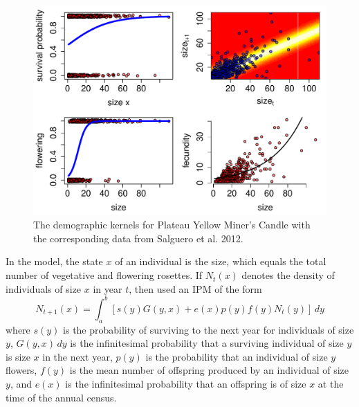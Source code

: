 \documentclass[12pt]{amsart}\usepackage[]{graphicx}\usepackage[]{color}
\makeatletter
\def\maxwidth{ %
  \ifdim\Gin@nat@width>\linewidth
    \linewidth
  \else
    \Gin@nat@width
  \fi
}
\newenvironment{kframe}{%
 \def\at@end@of@kframe{}%
 \ifinner\ifhmode%
  \def\at@end@of@kframe{\end{minipage}}%
  \begin{minipage}{\columnwidth}%
 \fi\fi%
 \def\FrameCommand##1{\hskip\@totalleftmargin \hskip-\fboxsep
 \colorbox{shadecolor}{##1}\hskip-\fboxsep
     \hskip-\linewidth \hskip-\@totalleftmargin \hskip\columnwidth}%
 \MakeFramed {\advance\hsize-\width
   \@totalleftmargin\z@ \linewidth\hsize
   \@setminipage}}%
 {\par\unskip\endMakeFramed%
 \at@end@of@kframe}
\newenvironment{knitrout}{}{} %
\makeatother
\begin{document}
\begin{knitrout}
\color{fgcolor}\begin{kframe}


{\ttfamily\noindent\itshape\color{messagecolor}{\#\# Loading required package: Matrix\\\#\# Loading required package: MASS\\\#\# Loading required package: nlme}}

{\ttfamily\noindent\color{warningcolor}{\#\# Warning in densfun(x, parm[1], parm[2], ...): NaNs produced}}\end{kframe}\begin{figure}
\includegraphics[width=\maxwidth]{figure/components-1} \caption[The demographic kernels for Plateau Yellow Miner's Candle with the corresponding data from Salguero et al]{The demographic kernels for Plateau Yellow Miner's Candle with the corresponding data from Salguero et al. 2012.}\label{fig:components}
\end{figure}


\end{knitrout}

In the model, the state $x$ of an individual is the size, which equals the total number of vegetative and flowering rosettes. If $N_t(x)$ denotes the density of individuals of size $x$ in year $t$, then \citet{salguero-etal-12} used an IPM of the form
\[
N_{t+1}(x)=\int_a^b \left[ s(y)G(y,x)+e(x)p(y)f(y)N_t(y)\right]\,dy
\]
where $s(y)$ is the probability of surviving to the next year for individuals of size $y$, $G(y,x) \, dy$ is the infinitesimal probability that a surviving individual of size $y$ is size $x$ in the next year, $p(y)$ is the probability that an individual of size $y$ flowers, $f(y)$ is the mean number of offspring produced by an individual of size $y$, and $e(x)$ is the infinitesimal probability that an offspring is of size $x$ at the time of the annual census.
\end{document}
